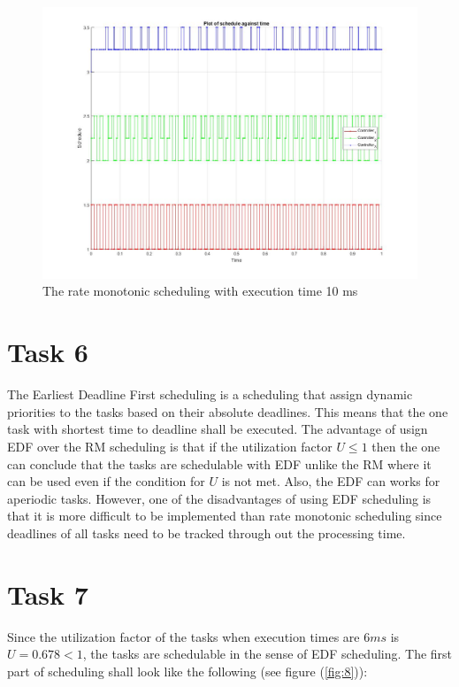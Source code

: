\documentclass[a4paper,12pt,oneside,onecolumn]{article} %
\begin{document}
\begin{figure}[H]
    \centering
    \includegraphics[scale=0.3]{schedule10.jpg}
    \caption{The rate monotonic scheduling with execution time 10 ms}
    \label{fig:7}
\end{figure}



\section*{Task 6}
The Earliest Deadline First scheduling is a scheduling that assign dynamic priorities to the tasks based on their absolute deadlines. This means that the one task with shortest time to deadline shall be executed. The advantage of usign EDF over the RM scheduling is that if the utilization factor $U\leq1$ then the one can conclude that the tasks are schedulable with EDF unlike the RM where it can be used even if the condition for $U$ is not met. Also, the EDF can works for aperiodic tasks. However, one of the disadvantages of using EDF scheduling is that it is more difficult to be implemented than rate monotonic scheduling since deadlines of all tasks need to be tracked through out the processing time.



\section*{Task 7}
Since the utilization factor of the tasks when execution times are $6ms$ is $U = 0.678 < 1$, the tasks are schedulable in the sense of EDF scheduling. The first part of scheduling shall look like the following (see figure (\ref{fig:8})):
\end{document}
